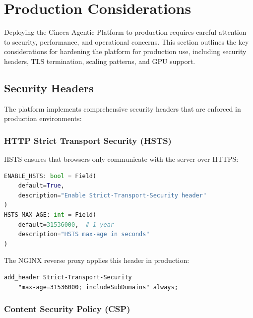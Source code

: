 
\section{Production Considerations}
\label{sec:production}

Deploying the Cineca Agentic Platform to production requires careful attention to security, performance, and operational concerns. This section outlines the key considerations for hardening the platform for production use, including security headers, TLS termination, scaling patterns, and GPU support.

\subsection{Security Headers}

The platform implements comprehensive security headers that are enforced in production environments:

\subsubsection{HTTP Strict Transport Security (HSTS)}

HSTS ensures that browsers only communicate with the server over HTTPS:

\begin{lstlisting}[language=Python, caption=HSTS configuration in src/config.py]
ENABLE_HSTS: bool = Field(
    default=True, 
    description="Enable Strict-Transport-Security header"
)
HSTS_MAX_AGE: int = Field(
    default=31536000,  # 1 year
    description="HSTS max-age in seconds"
)
\end{lstlisting}

The NGINX reverse proxy applies this header in production:

\begin{lstlisting}[language=nginx, caption=HSTS header in ops/nginx/nginx.conf]
add_header Strict-Transport-Security 
    "max-age=31536000; includeSubDomains" always;
\end{lstlisting}

\subsubsection{Content Security Policy (CSP)}

